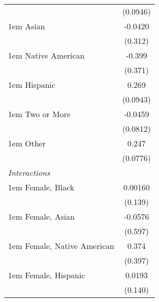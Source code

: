 \documentclass[9pt]{extarticle}
\begin{document}
{\begin{longtable}[l]{l*{1}{c}}
                                                  &                 (0.0946)         \\
[0.3em]
\kern 1em Asian                                   &                  -0.0420         \\
                                                  &                  (0.312)         \\
[0.3em]
\kern 1em Native American                         &                   -0.399         \\
                                                  &                  (0.371)         \\
[0.3em]
\kern 1em Hispanic                                &                    0.269\sym{**} \\
                                                  &                 (0.0943)         \\
[0.3em]
\kern 1em Two or More                             &                  -0.0459         \\
                                                  &                 (0.0812)         \\
[0.3em]
\kern 1em Other                                   &                    0.247\sym{**} \\
                                                  &                 (0.0776)         \\
[0.3em]
\emph{Interactions}								  &									 \\
[0.3em]
\kern 1em Female, Black                           &                  0.00160         \\
                                                  &                  (0.139)         \\
[0.3em]
\kern 1em Female, Asian                           &                  -0.0576         \\
                                                  &                  (0.597)         \\
[0.3em]
\kern 1em Female, Native American                 &                    0.374         \\
                                                  &                  (0.397)         \\
[0.3em]
\kern 1em Female, Hispanic                        &                   0.0193         \\
                                                  &                  (0.140)         \\
[0.3em]

\end{longtable}}
\end{document}
